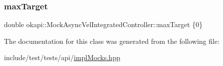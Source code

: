 \mbox{\label{classokapi_1_1MockAsyncVelIntegratedController_af51f5802f001c86f5e21a95c7deebd64}} 
\subsubsection{\texorpdfstring{maxTarget}{maxTarget}}
{\footnotesize\ttfamily double okapi\+::\+Mock\+Async\+Vel\+Integrated\+Controller\+::max\+Target \{0\}}



The documentation for this class was generated from the following file\+:\begin{DoxyCompactItemize}
\item 
include/test/tests/api/\mbox{\hyperlink{implMocks_8hpp}{impl\+Mocks.\+hpp}}\end{DoxyCompactItemize}
